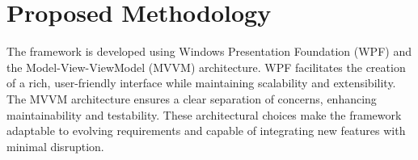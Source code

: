\documentclass[conference]{IEEEtran}
\begin{document}







\section{Proposed Methodology}
The framework is developed using Windows Presentation Foundation (WPF) and the Model-View-ViewModel (MVVM) architecture. WPF facilitates the creation of a rich, user-friendly interface while maintaining scalability and extensibility. The MVVM architecture ensures a clear separation of concerns, enhancing maintainability and testability. These architectural choices make the framework adaptable to evolving requirements and capable of integrating new features with minimal disruption.
\end{document}
